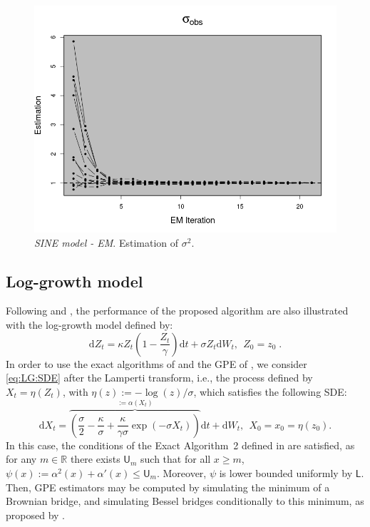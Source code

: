 \documentclass[12pt]{article}
\newcommand{\rmd}{\mathrm{d}}
\newcommand{\eqsp}{\;}
\newcommand{\1}{\mathrm{1}}
\begin{document}
\begin{figure}[p]
\centering
\includegraphics[scale=0.5]{figure_sigma2}
\caption{{\em SINE model - EM}. Estimation of $\sigma^2$.}
\label{fig:SINE:sigma}
\end{figure}


\subsection*{Log-growth model}
Following \cite{beskos:papaspiliopoulos:roberts:fearnhead:2006} and \cite{olsson:westerborn:2016}, the performance of the proposed algorithm are also illustrated with the log-growth model defined by:
\begin{equation}
\rmd Z_t = \kappa Z_t\left(1-\frac{Z_t}{\gamma}\right)\rmd t + \sigma Z_t \rmd W_t,~~Z_0=z_0\eqsp . \label{eq:LG:SDE}
\end{equation}
In order to use the exact algorithms of \cite{beskos:papaspiliopoulos:roberts:fearnhead:2006} and the GPE of \cite{fearnhead:papaspiliopoulos:roberts:2008}, we consider  \eqref{eq:LG:SDE} after the Lamperti transform, i.e., the process defined by $X_t=\eta(Z_t)$, with $\eta(z) := -\log (z)/\sigma$,  which satisfies the following SDE:
\begin{equation}
\rmd X_t = \overbrace{\left( \frac{\sigma}{2} -  \frac{\kappa}{\sigma} + \frac{\kappa}{\gamma\sigma}\exp\left(-\sigma X_t\right)\right)}^{:=\alpha(X_t)}\rmd t +\rmd W_t,~~X_0=x_0=\eta(z_0).\label{eq:Lamp:LG}
\end{equation}
In this case, the conditions of the Exact Algorithm~2 defined in \cite{beskos:papaspiliopoulos:roberts:fearnhead:2006} are satisfied, as for any $m \in \mathbb{R}$ there exists $\mathsf{U}_m$ such that for all $x\ge m$, $\psi(x):=\alpha^2(x)+\alpha'(x) \leq \mathsf{U}_m$. Moreover, $\psi$ is lower bounded uniformly by  $\mathsf{L}$. 
Then, GPE estimators may be computed by simulating the minimum of a Brownian bridge, and simulating Bessel bridges conditionally to this minimum, as proposed by \cite{beskos:papaspiliopoulos:roberts:fearnhead:2006}.
\end{document}
